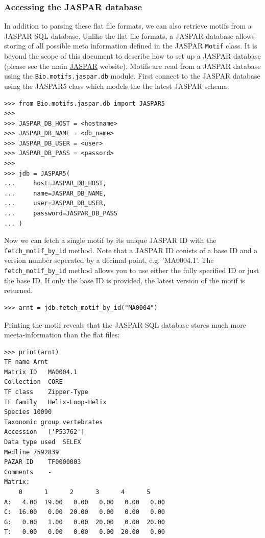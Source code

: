 \documentclass{report}
\begin{document}
\subsubsection*{Accessing the JASPAR database}

In addition to parsing these flat file formats, we can also retrieve motifs from a JASPAR SQL database. Unlike the flat file formats, a JASPAR database allows storing of all possible meta information defined in the JASPAR \verb+Motif+ class. It is beyond the scope of this document to describe how to set up a JASPAR database (please see the main \href{http://jaspar.genereg.net}{JASPAR} website). Motifs are read from a JASPAR database using the \verb+Bio.motifs.jaspar.db+ module.  First connect to the JASPAR database using the JASPAR5 class which models the the latest JASPAR schema:
\begin{verbatim}
>>> from Bio.motifs.jaspar.db import JASPAR5
>>> 
>>> JASPAR_DB_HOST = <hostname>
>>> JASPAR_DB_NAME = <db_name>
>>> JASPAR_DB_USER = <user>
>>> JASPAR_DB_PASS = <passord>
>>> 
>>> jdb = JASPAR5(
...     host=JASPAR_DB_HOST,
...     name=JASPAR_DB_NAME,
...     user=JASPAR_DB_USER,
...     password=JASPAR_DB_PASS
... )
\end{verbatim}

Now we can fetch a single motif by its unique JASPAR ID with the \verb+fetch_motif_by_id+ method. Note that a JASPAR ID conists of a base ID and a version number seperated by a decimal point, e.g. 'MA0004.1'. The \verb+fetch_motif_by_id+ method allows you to use either the fully specified ID or just the base ID. If only the base ID is provided, the latest version of the motif is returned.
\begin{verbatim}
>>> arnt = jdb.fetch_motif_by_id("MA0004")
\end{verbatim}
Printing the motif reveals that the JASPAR SQL database stores much more meeta-information than the flat files:
\begin{verbatim}
>>> print(arnt)
TF name	Arnt
Matrix ID	MA0004.1
Collection	CORE
TF class	Zipper-Type
TF family	Helix-Loop-Helix
Species	10090
Taxonomic group	vertebrates
Accession	['P53762']
Data type used	SELEX
Medline	7592839
PAZAR ID	TF0000003
Comments	-
Matrix:
	0      1      2      3      4      5
A:   4.00  19.00   0.00   0.00   0.00   0.00
C:  16.00   0.00  20.00   0.00   0.00   0.00
G:   0.00   1.00   0.00  20.00   0.00  20.00
T:   0.00   0.00   0.00   0.00  20.00   0.00


\end{verbatim}
\end{document}
